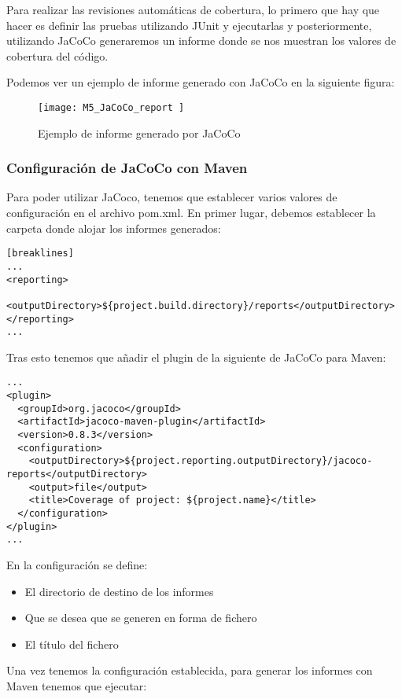 Para realizar las revisiones automáticas de cobertura, lo primero que hay que hacer es definir las pruebas utilizando JUnit y ejecutarlas y posteriormente, utilizando JaCoCo generaremos un informe donde se nos muestran los valores de cobertura del código.

Podemos ver un ejemplo de informe generado con JaCoCo en la siguiente figura:

\begin{figure}[!h]
	\centering
	\texttt{[image: M5\_JaCoCo\_report ]}
	\caption{Ejemplo de informe generado por JaCoCo}\label{fig:M5_JaCoCo_report}
\end{figure}
\FloatBarrier


\subsubsection{Configuración de JaCoCo con Maven}

Para poder utilizar JaCoco, tenemos que establecer varios valores de configuración en el archivo pom.xml. En primer lugar, debemos establecer la carpeta donde alojar los informes generados:\\
\begin{minipage}{\linewidth}
{\tiny
\begin{verbatim}[breaklines]
...
<reporting>
  <outputDirectory>${project.build.directory}/reports</outputDirectory>
</reporting>
...
\end{verbatim}
}
\end{minipage}
Tras esto tenemos que añadir el plugin de la siguiente de JaCoCo para Maven:\\
\begin{minipage}{\linewidth}
{\tiny
\begin{verbatim}
...
<plugin>
  <groupId>org.jacoco</groupId>
  <artifactId>jacoco-maven-plugin</artifactId>
  <version>0.8.3</version>
  <configuration>
	<outputDirectory>${project.reporting.outputDirectory}/jacoco-reports</outputDirectory>
	<output>file</output>
	<title>Coverage of project: ${project.name}</title>
  </configuration>
</plugin>
...
\end{verbatim}
}
\end{minipage}
En la configuración se define:
\begin{itemize}
	\tightlist
	\item El directorio de destino de los informes
	\item Que se desea que se generen en forma de fichero
	\item El título del fichero
\end{itemize}
 Una vez tenemos la configuración establecida, para generar los informes con Maven tenemos que ejecutar:
 
